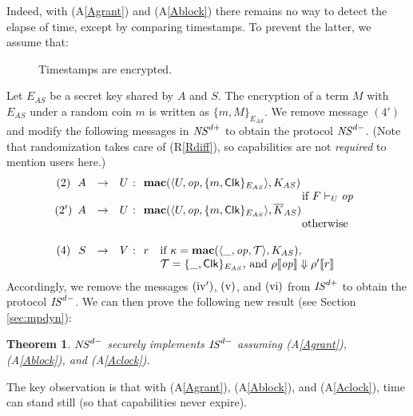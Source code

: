 \documentclass[10pt]{article}
\makeatletter
\newtheorem{theorem}{Theorem}
\newcounter{Cassums}
\newcommand{\func}[1]{{\bf #1}}
\newcommand{\clk}{\mathsf{Clk}}
\newcommand{\op}{{\it op}}
\newcommand{\tup}[1]{\langle #1\rangle}
\newcommand{\A}{\addtocounter{Cassums}{1}A\arabic{Cassums}\gdef\@currentlabel{\arabic{Cassums}}}
\makeatother
\begin{document}
Indeed, with (A\ref{Agrant}) and (A\ref{Ablock}) there remains no way to detect the elapse of time, except by comparing timestamps. To prevent the latter, we
 assume that:
\begin{description}
\item[\A]\label{Aclock} Timestamps are encrypted.\end{description}
Let $E_{AS}$ be a secret key shared by $A$ and $S$. The encryption of a term $M$ with $E_{AS}$ under a random coin $m$ is written as $\{m,M\}_{E_{AS}}$. We remove  message $(4')$ and modify the following messages in ${\it NS}^{d+}$ to obtain the protocol ${\it NS}^{d-}$. (Note that randomization takes care of (R\ref{Rdiff}), so capabilities are not \emph{required} to mention users here.) 
\[
\left.
\begin{array}{crclcl}
\!\!\!\! (2)\!\! &\! A & \rightarrow  & U \!\!\!& \!\!\!:\!\!\! &\! \func{mac}(\tup{U,\op,\{m,\clk\}_{E_{AS}}},K_{AS})\\
&&&&&~~~~~~~~~~~~~~~~~~~~~~~~~~~~~~~~~~~~~~~~~\mbox{ if }F \vdash_U \op \\
\!\!\!\! (2')\!\! &\! A & \rightarrow  & U \!\!\!& \!\!\!:\!\!\! &\! \func{mac}(\tup{U,\op,\{m,\clk\}_{E_{AS}}},\overline K_{AS})\\
&&&&&~~~~~~~~~~~~~~~~~~~~~~~~~~~~~~~~~~~~~~~~~\mbox{ otherwise} \\
\\
\!\!\!\! (4)\!\! &\! S & \rightarrow  & V \!\!\!& \!\!\!:\!\!\! &\! r~~\mbox{ if }\kappa = \func{mac}(\tup{\_,\op,\mathcal T},K_{AS})\mbox{,} \\
 &&&&&~~~~\mathcal T = \{\_,\clk\}_{E_{AS}}\mbox{, and }\rho\llbracket\op\rrbracket \Downarrow \rho'\llbracket r\rrbracket 
\end{array}
\right.
\]
Accordingly, we remove the messages $({\rm iv'})$, $({\rm v})$, and $({\rm vi})$ from ${\it IS}^{d+}$ to obtain the protocol ${\it IS}^{d-}$. We can then prove the following new result (see Section \ref{sec:mpdyn}):
\begin{theorem} ${\it NS}^{d-}$ securely implements ${\it IS}^{d-}$ assuming {\rm (A\ref{Agrant})}, {\rm (A\ref{Ablock})}, and {\rm (A\ref{Aclock})}.
\end{theorem}
\noindent
The key observation is that with (A\ref{Agrant}), (A\ref{Ablock}), and (A\ref{Aclock}), time can stand still (so that capabilities never expire). 
\end{document}
